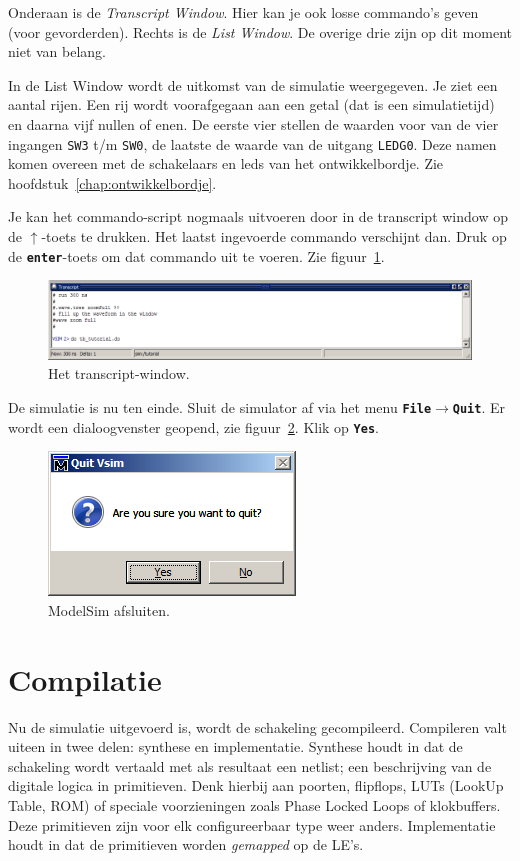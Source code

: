 \documentclass[a4paper,12pt,fleqn,twoside]{book}
\def\tutpicscale{0.455}
\newcommand{\menu}[1]{\texttt{\textbf{#1}}}
\newcommand{\knop}[1]{\texttt{\textbf{#1}}}
\newcommand{\naam}[1]{\texttt{#1}}
\def\pijl{$\rightarrow$}%
\begin{document}
Onderaan is de \textsl{Transcript Window}. Hier kan je ook losse commando's
geven (voor gevorderden). Rechts is de \textsl{List Window}. De overige drie
zijn op dit moment niet van belang. 
 
In de List Window wordt de uitkomst van de simulatie weergegeven. Je ziet een
aantal rijen. Een rij wordt voorafgegaan aan een getal (dat is een
simulatietijd) en daarna vijf nullen of enen. De eerste vier stellen de
waarden voor van de vier ingangen \naam{SW3} t/m \naam{SW0}, de laatste de
waarde van de uitgang \naam{LEDG0}. Deze namen komen overeen met de schakelaars
en leds van het ontwikkelbordje. Zie hoofdstuk~\ref{chap:ontwikkelbordje}.

Je kan het commando-script nogmaals uitvoeren door in de transcript window
op de $\uparrow$-toets te drukken. Het laatst ingevoerde commando verschijnt
dan. Druk op de \knop{enter}-toets om dat commando uit te voeren. Zie
figuur~\ref{fig:045transcriptwindow}.

\begin{figure}[H]
\centering
\includegraphics[scale=\tutpicscale]{045transcriptwindow}
\caption{Het transcript-window.}
\label{fig:045transcriptwindow}
\end{figure}

De simulatie is nu ten einde. Sluit de simulator af via het menu
\menu{File\pijl{}Quit}. Er wordt een dialoogvenster geopend, zie
figuur~\ref{fig:046wantoquit}. Klik op \knop{Yes}.

\begin{figure}[H]
\centering
\includegraphics[scale=\tutpicscale]{046wantoquit}
\caption{ModelSim afsluiten.}
\label{fig:046wantoquit}
\end{figure}


\section{Compilatie}
\label{sec:compilatie}
Nu de simulatie uitgevoerd is, wordt de schakeling gecompileerd. Compileren
valt uiteen in twee delen: synthese en implementatie. Synthese houdt in dat de
schakeling wordt vertaald met als resultaat een netlist; een beschrijving van
de digitale logica in primitieven. Denk hierbij aan poorten, flipflops, LUTs
(LookUp Table, ROM) of speciale voorzieningen zoals Phase Locked Loops of
klokbuffers. Deze primitieven zijn voor elk configureerbaar type weer anders. 
Implementatie houdt in dat de primitieven worden \textsl{gemapped} op de LE's.
\end{document}
